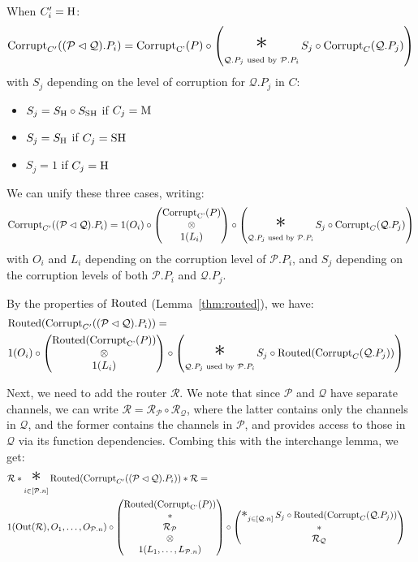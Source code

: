 \begin{theorem}
When $C'_i = \text{H}$:
$$
\tx{Corrupt}_{C'}((\mathcal{P} \lhd \mathcal{Q}).P_i) =
  \tx{Corrupt}_{\tx{C'}}(P)
\circ
\left(
\bigast_{\mathcal{Q}.P_j \tx{ used by } \mathcal{P}.P_i}
  S_j \circ \tx{Corrupt}_C(\mathcal{Q}.P_j)
\right)
$$
with $S_j$ depending on the level of corruption for $\mathcal{Q}.P_j$ in $C$:
\begin{itemize}
  \item $S_j = S_{\text{H}} \circ S_{\text{SH}}$ if $C_j = \text{M}$
  \item $S_j = S_{\text{H}}$ if $C_j = \text{SH}$
  \item $S_j = 1$ if $C_j = \text{H}$
\end{itemize}

We can unify these three cases, writing:
$$
\tx{Corrupt}_{C'}((\mathcal{P} \lhd \mathcal{Q}).P_i) =
1(O_i) \circ
\begin{pmatrix}
  \tx{Corrupt}_{\tx{C'}}(P)\cr
  \otimes\cr
  1(L_i)
\end{pmatrix}
\circ
\left(
\bigast_{\mathcal{Q}.P_j \tx{ used by } \mathcal{P}.P_i}
  S_j \circ \tx{Corrupt}_C(\mathcal{Q}.P_j)
\right)
$$
with $O_i$ and $L_i$ depending on the corruption level of $\mathcal{P}.P_i$,
and $S_j$ depending on the corruption levels of both $\mathcal{P}.P_i$
and $\mathcal{Q}.P_j$.

By the properties of $\text{Routed}$ (Lemma~\ref{thm:routed}), we have:
$$
\begin{aligned}
&\tx{Routed}(\tx{Corrupt}_{C'}((\mathcal{P} \lhd \mathcal{Q}).P_i)) =\cr
&1(O_i) \circ
\begin{pmatrix}
  \tx{Routed}(\tx{Corrupt}_{\tx{C'}}(P))\cr
  \otimes\cr
  1(L_i)
\end{pmatrix}
\circ
\left(
\bigast_{\mathcal{Q}.P_j \tx{ used by } \mathcal{P}.P_i}
  S_j \circ \tx{Routed}(\tx{Corrupt}_C(\mathcal{Q}.P_j))
\right)
\end{aligned}
$$

Next, we need to add the router $\mathcal{R}$.
We note that since $\mathcal{P}$ and $\mathcal{Q}$ have separate channels,
we can write $\mathcal{R} = \mathcal{R}_{\mathcal{P}} \circ \mathcal{R}_{\mathcal{Q}}$,
where the latter contains only the channels in $\mathcal{Q}$,
and the former contains the channels in $\mathcal{P}$,
and provides access to those in $\mathcal{Q}$ via its function dependencies.
Combing this with the interchange lemma, we get:
$$
\begin{aligned}
&\mathcal{R} * \bigast_{i \in [\mathcal{P}.n]}\tx{Routed}(\tx{Corrupt}_{C'}((\mathcal{P} \lhd \mathcal{Q}).P_i)) * \mathcal{R} =\cr
&1(\tx{Out}(\mathcal{R}), O_1, \ldots, O_{\mathcal{P}.n}) \circ
\begin{pmatrix}
  \tx{Routed}(\tx{Corrupt}_{\tx{C'}}(P))\cr
  *\cr
  \mathcal{R}_{\mathcal{P}}\cr
  \otimes\cr
  1(L_1, \ldots, L_{\mathcal{P}.n})
\end{pmatrix}
\circ
\begin{pmatrix}
\bigast_{j \in [\mathcal{Q}.n]}
  S_j \circ \tx{Routed}(\tx{Corrupt}_C(\mathcal{Q}.P_j))
  \cr
  *\cr
  \mathcal{R}_{\mathcal{Q}}
\end{pmatrix}
\end{aligned}
$$


\end{theorem}
